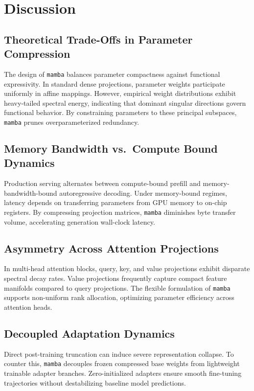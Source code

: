 \section{Discussion}

\subsection{Theoretical Trade-Offs in Parameter Compression}
The design of \texttt{mamba} balances parameter compactness against functional expressivity. In standard dense projections, parameter weights participate uniformly in affine mappings. However, empirical weight distributions exhibit heavy-tailed spectral energy, indicating that dominant singular directions govern functional behavior. By constraining parameters to these principal subspaces, \texttt{mamba} prunes overparameterized redundancy.

\subsection{Memory Bandwidth vs.\ Compute Bound Dynamics}
Production serving alternates between compute-bound prefill and memory-bandwidth-bound autoregressive decoding. Under memory-bound regimes, latency depends on transferring parameters from GPU memory to on-chip registers. By compressing projection matrices, \texttt{mamba} diminishes byte transfer volume, accelerating generation wall-clock latency.

\subsection{Asymmetry Across Attention Projections}
In multi-head attention blocks, query, key, and value projections exhibit disparate spectral decay rates. Value projections frequently capture compact feature manifolds compared to query projections. The flexible formulation of \texttt{mamba} supports non-uniform rank allocation, optimizing parameter efficiency across attention heads.

\subsection{Decoupled Adaptation Dynamics}
Direct post-training truncation can induce severe representation collapse. To counter this, \texttt{mamba} decouples frozen compressed base weights from lightweight trainable adapter branches. Zero-initialized adapters ensure smooth fine-tuning trajectories without destabilizing baseline model predictions.

